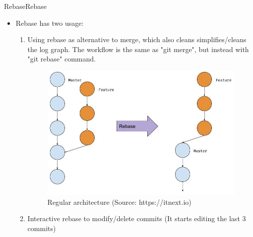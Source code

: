 \begin{frame}{Rebase}{Rebase}
\begin{itemize}
\item Rebase has two usage:
\begin{enumerate}
\item Using rebase as alternative to merge, which also cleans simplifies/cleans
the log graph. The workflow is the same as "git merge", but instead with "git rebase" command.
  \begin{figure}
    \begin{center}
    \includegraphics[width=0.4\linewidth]{pics/rebase-merge.jpeg}
    \vspace{-0.3cm}
    \caption{\footnotesize Regular architecture (Source: https://itnext.io)}
  \end{center}
\end{figure}
\item Interactive rebase to modify/delete commits
 (It starts editing the last 3 commits)
\end{enumerate}
\end{itemize}
\end{frame}
